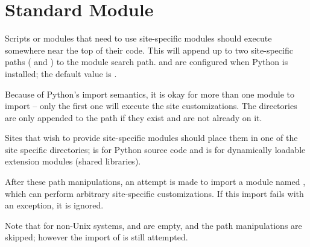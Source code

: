 \section{Standard Module }

Scripts or modules that need to use site-specific modules should
execute  somewhere near the top of their code.  This
will append up to two site-specific paths ( and
) to the module search path. 
 and  are configured when Python is installed; the default value is .   

Because of Python's import semantics, it is okay for more than one
module to import  -- only the first one will execute the
site customizations.  The directories are only appended to the path if
they exist and are not already on it.

Sites that wish to provide site-specific modules should place them in
one of the site specific directories;  is for Python source code and
 is for dynamically
loadable extension modules (shared libraries).

After these path manipulations, an attempt is made to import a module
named , which can perform arbitrary site-specific
customizations.  If this import fails with an 
exception, it is ignored.

Note that for non-Unix systems,  and
 are empty, and the path manipulations are
skipped; however the import of  is still attempted.
